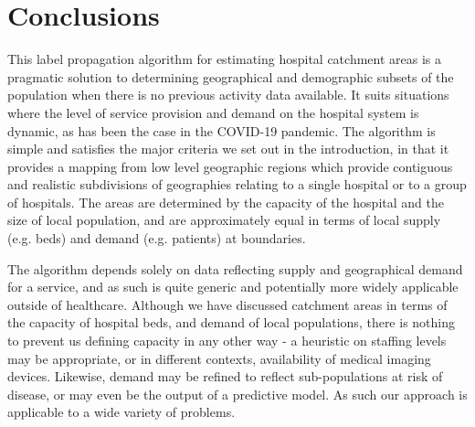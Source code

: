\documentclass[twocolumn]{bmcart}%
\begin{document}
\section*{Conclusions}

This label propagation algorithm for estimating hospital catchment areas is a pragmatic solution to determining 
geographical and demographic subsets of the population when there is no previous activity data available. It suits 
situations where the level of service provision and demand on the hospital system is dynamic, as has been the case in 
the COVID-19 pandemic. The algorithm is simple and satisfies the major criteria we set out in the introduction, in that 
it provides a mapping from low level geographic regions which provide contiguous and realistic subdivisions of 
geographies relating to a single hospital or to a group of hospitals. The areas are determined by the capacity of the 
hospital and the size of local population, and are approximately equal in terms of local supply (e.g. beds) and demand 
(e.g. patients) at boundaries.

The algorithm depends solely on data reflecting supply and geographical demand for a service, and as such is quite 
generic and potentially more widely applicable outside of healthcare. Although we have discussed catchment areas in 
terms of the capacity of hospital beds, and demand of local populations, there is nothing to prevent us defining 
capacity in any other way - a heuristic on staffing levels may be appropriate, or in different contexts, availability 
of medical imaging devices. Likewise, demand may be refined to reflect sub-populations at risk of disease, or may even 
be the output of a predictive model. As such our approach is applicable to a wide variety of problems.

\end{document}
